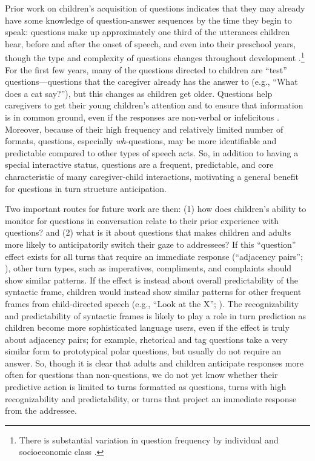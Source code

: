 \documentclass[authoryear, 12pt]{elsarticle}
\begin{document}
Prior work on children's acquisition of questions indicates that they may already have some knowledge of question-answer sequences by the time they begin to speak: questions make up approximately one third of the utterances children hear, before and after the onset of speech, and even into their preschool years, though the type and complexity of questions changes throughout development \citep{casillas2016, fitneva2012, henning2005, shatz1979}.\footnote{There is substantial variation in question frequency by individual and socioeconomic class \citep{hart1992, weisleder2012}.} For the first few years, many of the questions directed to children are ``test'' questions---questions that the caregiver already has the answer to (e.g., ``What does a cat say?''), but this changes as children get older. Questions help caregivers to get their young children's attention and to ensure that information is in common ground, even if the responses are non-verbal or infelicitous \citep{bruner1985, fitneva2012, snow1977}. Moreover, because of their high frequency and relatively limited number of formats, questions, especially \textit{wh}-questions, may be more identifiable and predictable compared to other types of speech acts. So, in addition to having a special interactive status, questions are a frequent, predictable, and core characteristic of many caregiver-child interactions, motivating a general benefit for questions in turn structure anticipation.

Two important routes for future work are then: (1) how does children's ability to monitor for questions in conversation relate to their prior experience with questions? and (2) what is it about questions that makes children and adults more likely to anticipatorily switch their gaze to addressees? If this ``question'' effect exists for all turns that require an immediate response (``adjacency pairs''; \citealp{schegloff2007}), other turn types, such as imperatives, compliments, and complaints should show similar patterns. If the effect is instead about overall predictability of the syntactic frame, children would instead show similar patterns for other frequent frames from child-directed speech (e.g., ``Look at the X''; \citealp{mintz2003}). The recognizability and predictability of syntactic frames is likely to play a role in turn prediction as children become more sophisticated language users, even if the effect is truly about adjacency pairs; for example, rhetorical and tag questions take a very similar form to prototypical polar questions, but usually do not require an answer. So, though it is clear that adults and children anticipate responses more often for questions than non-questions, we do not yet know whether their predictive action is limited to turns formatted as questions, turns with high recognizability and predictability, or turns that project an immediate response from the addressee.
\end{document}
